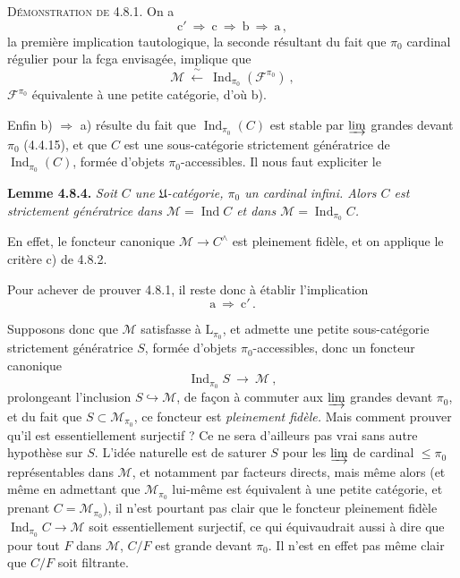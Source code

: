 \documentclass[11pt]{article}
\newcommand{\printedpage}[1]{\marginpar{\footnotesize p.~#1}}
\newcommand{\msp}[1]{\marginpar{\footnotesize [#1]}}
\newcommand{\Ind}{\operatorname{Ind}}
\begin{document}
\textsc{Démonstration de 4.8.1.} On a
\[
\mathrm{c}' \ \Longrightarrow \ \mathrm{c} \ \Longrightarrow \ \mathrm{b} \ \Longrightarrow \ \mathrm{a} \, ,
\]
la première implication tautologique, la seconde résultant du fait que $\pi_0$ cardinal régulier pour la fcga envisagée, implique que
\[
\mathcal{M} \ \xleftarrow{\ \sim\ } \ \Ind_{\pi_0}(\mathcal{F}^{\pi_0}) \ ,
\]
$\mathcal{F}^{\pi_0}$ équivalente à une petite catégorie, d'où b).

\msp{page 198}
Enfin b) $\Longrightarrow$ a) résulte du fait que $\Ind_{\pi_0}(C)$ est stable par $\varinjlim$ grandes devant $\pi_0$ (4.4.15), et que $C$ est une sous-catégorie strictement génératrice de $\Ind_{\pi_0}(C)$, formée d'objets $\pi_0$-accessibles. Il nous faut expliciter le

\textbf{Lemme 4.8.4.} \textit{Soit $C$ une $\mathfrak{U}$-catégorie, $\pi_0$ un cardinal infini. Alors $C$ est strictement génératrice dans $\mathcal{M}=\Ind C$ et dans $\mathcal{M}=\Ind_{\pi_0}C$.}

\msp{page 199}
En effet, le foncteur canonique $\mathcal{M}\longrightarrow C^\wedge$ est pleinement fidèle, et on applique le critère c) de 4.8.2.

Pour achever de prouver 4.8.1, il reste donc à établir l'implication
\[
\mathrm{a} \ \Longrightarrow \ \mathrm{c}' \, .
\]

\printedpage{70}

Supposons donc que $\mathcal{M}$ satisfasse à $\mathrm{L}_{\pi_0}$, et admette une petite sous-catégorie strictement génératrice $S$, formée d'objets $\pi_0$-accessibles, donc un foncteur canonique
\[
\Ind_{\pi_0}S \ \longrightarrow \ \mathcal{M} \ ,
\]
prolongeant l'inclusion $S\hookrightarrow\mathcal{M}$, de façon à commuter aux $\varinjlim$ grandes devant $\pi_0$, et du fait que $S\subset\mathcal{M}_{\pi_0}$, ce foncteur est \textit{pleinement fidèle.} Mais comment prouver qu'il est essentiellement surjectif ? Ce ne sera d'ailleurs pas vrai sans autre hypothèse sur $S$. L'idée naturelle est de saturer $S$ pour les $\varinjlim$
\msp{page 200}
de cardinal $\leqslant\pi_0$ représentables dans $\mathcal{M}$, et notamment par facteurs directs, mais même alors (et même en admettant que $\mathcal{M}_{\pi_0}$ lui-même est équivalent à une petite catégorie, et prenant $C=\mathcal{M}_{\pi_0}$), il n'est pourtant pas clair que le foncteur pleinement fidèle $\Ind_{\pi_0}C\longrightarrow\mathcal{M}$ soit essentiellement surjectif, ce qui équivaudrait aussi à dire que pour tout $F$ dans $\mathcal{M}$, $C/F$ est grande devant $\pi_0$. Il n'est en effet pas même clair que $C/F$ soit filtrante.
\end{document}
